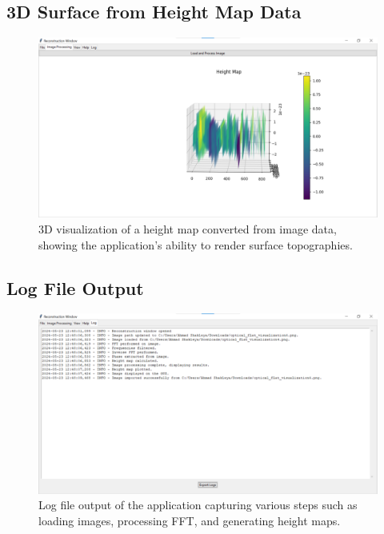 \documentclass[../main.tex]{subfiles}
\begin{document}
\subsection{3D Surface from Height Map Data}
\begin{figure}[H]
\centering
\includegraphics[width=\textwidth]{Images/Appendix/reconstruction/3D_surface}
\caption{3D visualization of a height map converted from image data, showing the application’s ability to render surface topographies.}
\end{figure}

\subsection{Log File Output}
\begin{figure}[H]
\centering
\includegraphics[width=\textwidth]{Images/Appendix/reconstruction/log}
\caption{Log file output of the application capturing various steps such as loading images, processing FFT, and generating height maps.}
\end{figure}
\end{document}
